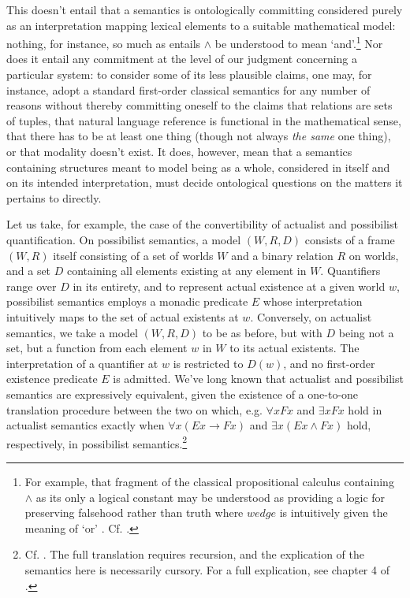 \documentclass[]{article}
\begin{document}
This doesn't entail that a semantics is ontologically committing considered purely as an interpretation mapping lexical elements to a suitable mathematical model: 
nothing, for instance, so much as entails $\wedge$ be understood to mean `and'.\footnote{For example, 
	that fragment of the classical propositional calculus containing $\wedge$ as its only a logical constant may be understood as providing a logic for preserving falsehood rather than truth 
	where $wedge$ is intuitively given the meaning of `or' . Cf. \autocite[222]{Kripke2015}.}
Nor does it entail any commitment at the level of our judgment concerning a particular system: 
to consider some of its less plausible claims, 
one may, for instance, adopt a standard first-order classical semantics for any number of reasons 
without thereby committing oneself to the claims 
that relations are sets of tuples, 
that natural language reference is functional in the mathematical sense, 
that there has to be at least one thing (though not always \emph{the same} one thing), 
or that modality doesn't exist.
It does, however, mean
that a semantics containing structures meant to model being as a whole, 
considered in itself and on its intended interpretation, 
must decide ontological questions on the matters it pertains to directly. 

Let us take, for example, the case of the convertibility of actualist and possibilist quantification. 
On possibilist semantics, a model $(W, R, D)$ consists of a frame $(W, R)$ 
itself consisting of a set of worlds $W$ and a binary relation $R$ on worlds, 
and a set $D$ containing all elements existing at any element in $W$. 
Quantifiers range over $D$ in its entirety, 
and to represent actual existence at a given world $w$, 
possibilist semantics employs a monadic predicate $E$ 
whose interpretation intuitively maps to the set of actual existents at $w$. 
Conversely, on actualist semantics, 
we take a model $(W, R, D)$ to be as before, 
but with $D$ being not a set, but a function from each element $w$ in $W$ to its actual existents. 
The interpretation of a quantifier at $w$ is restricted to $D(w)$, 
and no first-order existence predicate $E$ is admitted.
We've long known that actualist and possibilist semantics are expressively equivalent, 
given the existence of a one-to-one translation procedure between the two on which, e.g. 
$\forall x Fx $ and $\exists x Fx$ hold in actualist semantics 
exactly when $\forall x (Ex \rightarrow Fx)$ and $\exists x(Ex \wedge Fx)$ hold, respectively, in possibilist semantics.\footnote{
	Cf. \autocite{Lejewski1954}. 
	The full translation requires recursion, 
	and the explication of the semantics here is necessarily cursory. 
	For a full explication, see chapter 4 of \autocite{Fitting1998}.}
\end{document}
